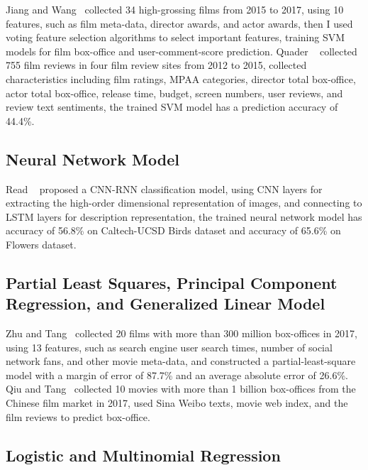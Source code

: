 \documentclass[review]{cvpr}
\begin{document}
  Jiang and Wang~\cite{jiang2018predicting} collected 34 high-grossing films from 2015 to 2017, using 10 features, such as film meta-data, director awards, and actor awards, then I used voting feature selection algorithms to select important features,
  training SVM models for film box-office and user-comment-score prediction.
  Quader \etal~\cite{quader2017machine} collected 755 film reviews in four film review sites from 2012 to 2015, collected characteristics including film ratings, MPAA categories,
  director total box-office, actor total box-office, release time, budget, screen numbers, user reviews, and review text sentiments,
  the trained SVM model has a prediction accuracy of 44.4\%.

\subsection{Neural Network Model}

  Read \etal ~\cite{read2016learning} proposed a CNN-RNN classification model, using CNN layers for extracting the high-order dimensional representation of images,
  and connecting to LSTM layers for description representation, the trained neural network model has accuracy of 56.8\% on Caltech-UCSD Birds dataset and accuracy of 65.6\% on Flowers dataset.


\subsection{Partial Least Squares, Principal Component Regression, and Generalized Linear Model}

  Zhu and Tang~\cite{zhu2019film} collected 20 films with more than 300 million box-offices in 2017, using 13 features, such as search engine user search times, number of social network fans, and other movie meta-data,
  and constructed a partial-least-square model with a margin of error of 87.7\% and an average absolute error of 26.6\%.
  Qiu and Tang~\cite{qiu2018microblog} collected 10 movies with more than 1 billion box-offices from the Chinese film market in 2017, used Sina Weibo texts, movie web index, and the film reviews to predict box-office.

\subsection{Logistic and Multinomial Regression}
\end{document}
